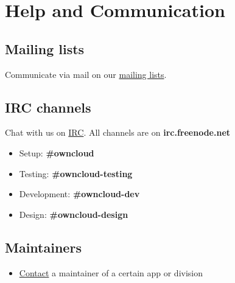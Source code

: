\documentclass[letterpaper,10pt,english]{sphinxmanual}
\begin{document}
\section{Help and Communication}
\label{commun/index:help-and-communication}\label{commun/index::doc}\label{commun/index:apps-repository}

\subsection{Mailing lists}
\label{commun/index:mailing-lists}
Communicate via mail on our \href{https://mailman.owncloud.org}{mailing lists}.


\subsection{IRC channels}
\label{commun/index:irc-channels}
Chat with us on \href{http://www.irchelp.org/}{IRC}. All channels are on \textbf{irc.freenode.net}
\begin{itemize}
\item {} 
Setup: \textbf{\#owncloud}

\item {} 
Testing: \textbf{\#owncloud-testing}

\item {} 
Development: \textbf{\#owncloud-dev}

\item {} 
Design: \textbf{\#owncloud-design}

\end{itemize}


\subsection{Maintainers}
\label{commun/index:maintainers}\begin{itemize}
\item {} 
\href{https://owncloud.org/contact/}{Contact} a maintainer of a certain app or division

\end{itemize}



\renewcommand{\indexname}{Index}
\printindex
\end{document}
